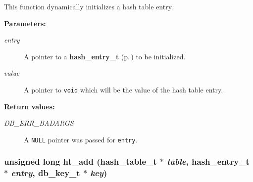  This function dynamically initializes a hash table entry.\begin{Desc}
\item[{\bf Parameters: }]\par
\begin{description}
\item[
{\em entry}]A pointer to a {\bf hash\_\-entry\_\-t} {\rm (p.\,\pageref{group__dbprim__hash_a1})} to be initialized. \item[
{\em value}]A pointer to {\tt void} which will be the value of the hash table entry.\end{description}
\end{Desc}
\begin{Desc}
\item[{\bf Return values: }]\par
\begin{description}
\item[
{\em DB\_\-ERR\_\-BADARGS}]A {\tt NULL} pointer was passed for {\tt entry}. \end{description}
\end{Desc}
\subsubsection{\setlength{\rightskip}{0pt plus 5cm}unsigned long ht\_\-add ({\bf hash\_\-table\_\-t} $\ast$ {\em table}, {\bf hash\_\-entry\_\-t} $\ast$ {\em entry}, {\bf db\_\-key\_\-t} $\ast$ {\em key})}\label{group__dbprim__hash_a7}




